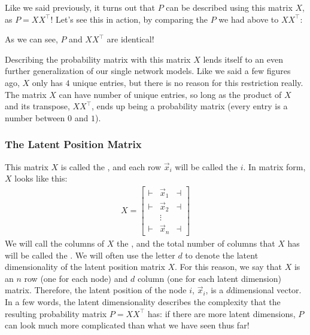 \documentclass[letterpaper,10pt,english]{jupyterBook}
\begin{document}
\sphinxAtStartPar
Like we said previously, it turns out that \(P\) can be described using  this matrix \(X\), as \(P = XX^\top\)! Let’s see this in action, by comparing the \(P\) we had above to \(XX^\top\):

\noindent{}

\sphinxAtStartPar
As we can see, \(P\) and \(XX^\top\) are identical!

\sphinxAtStartPar
Describing the probability matrix with this matrix \(X\) lends itself to an even further generalization of our single network models. Like we said a few figures ago, \(X\) only has \(4\) unique entries, but there is no reason for this restriction really. The matrix \(X\) can have  number of unique entries, so long as the product of \(X\) and its transpose, \(XX^\top\), ends up being a probability matrix (every entry is a number between \(0\) and \(1\)).


\subsubsection{The Latent Position Matrix}
\label{\detokenize{representations/ch5/single-network-models_RDPG:the-latent-position-matrix}}
\sphinxAtStartPar
This matrix \(X\) is called the , and each row \(\vec x_i\) will be called the  \(i\). In matrix form, \(X\) looks like this:
\begin{align*}
 X = \begin{bmatrix}
     \vdash & \vec x_1 & \dashv \\
     \vdash & \vec x_2 & \dashv \\
     & \vdots & \\
     \vdash & \vec x_n & \dashv
 \end{bmatrix}
\end{align*}
\sphinxAtStartPar
We will call the columns of \(X\) the , and the total number of columns that \(X\) has will be called the . We will often use the letter \(d\) to denote the latent dimensionality of the latent position matrix \(X\). For this reason, we say that \(X\) is an \(n\) row (one for each node) and \(d\) column (one for each latent dimension) matrix. Therefore, the latent position of the node \(i\), \(\vec x_i\), is a \(d\)\sphinxhyphen{}dimensional vector. In a few words, the latent dimensionality describes the complexity that the resulting probability matrix \(P = XX^\top\) has: if there are more latent dimensions, \(P\) can look much more complicated than what we have seen thus far!
\end{document}
